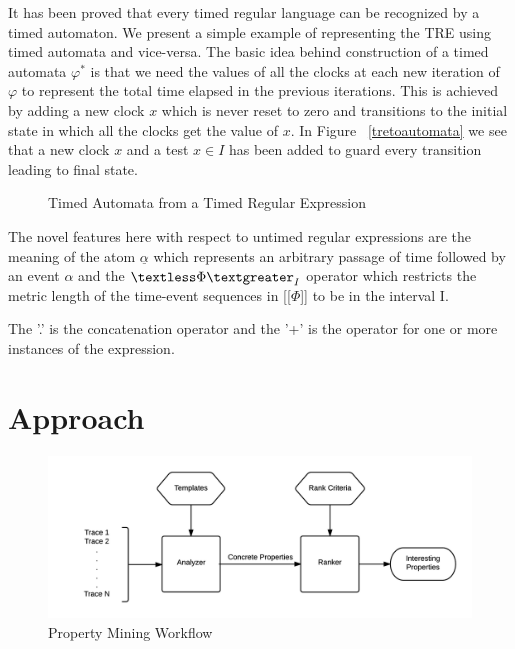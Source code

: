 \documentclass[]{sigplanconf}
\begin{document}
It has been proved \cite{timedregex} that every timed regular language can be recognized by a timed automaton.  We present a simple example of representing the TRE using timed automata and vice-versa. The basic idea behind construction of a timed automata $\varphi^*$ is that we need the values of all the clocks at each new iteration of $\varphi$ to represent the total time elapsed in the previous iterations. This is achieved by adding a new clock $x$ which is never reset to zero and transitions to the initial state in which all the clocks get the value of $x$. In Figure ~\ref{tretoautomata} we see that a new clock $x$ and a test $x \in I$ has been added to guard every transition leading to final state.
\begin{figure}
\caption{Timed Automata from a Timed Regular Expression}
\end{figure}

The novel features here with respect to untimed regular expressions are the meaning of the atom $\underline{\alpha}$ which represents an arbitrary passage of time followed by an event $\alpha$ and the $\textless \Phi \textgreater _I$ operator which restricts the metric length of the time-event sequences in [[$\Phi$]] to be in the interval I.

The '.' is the concatenation operator and the '+' is the operator for one or more instances of the expression.

\section{Approach} \label{Approach}

\begin{figure}[h]
  \centering
  \includegraphics[trim = 1cm 0cm 0cm 0cm,clip = true,width=\linewidth]{figures/Workflow.png}
  \caption{Property Mining Workflow}
  \label{fig:work-flow Overview}
\end{figure}
\end{document}
